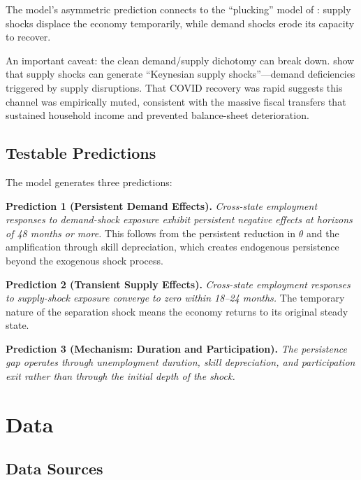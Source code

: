 \documentclass[12pt]{article}
\begin{document}
The model's asymmetric prediction connects to the ``plucking'' model of \citet{dupraz2022plucking}: supply shocks displace the economy temporarily, while demand shocks erode its capacity to recover.

An important caveat: the clean demand/supply dichotomy can break down. \citet{guerrieri2022macroeconomic} show that supply shocks can generate ``Keynesian supply shocks''---demand deficiencies triggered by supply disruptions. That COVID recovery was rapid suggests this channel was empirically muted, consistent with the massive fiscal transfers that sustained household income and prevented balance-sheet deterioration.

\subsection{Testable Predictions}

The model generates three predictions:

\medskip

\noindent \textbf{Prediction 1 (Persistent Demand Effects).} \textit{Cross-state employment responses to demand-shock exposure exhibit persistent negative effects at horizons of 48 months or more.} This follows from the persistent reduction in $\theta$ and the amplification through skill depreciation, which creates endogenous persistence beyond the exogenous shock process.

\medskip

\noindent \textbf{Prediction 2 (Transient Supply Effects).} \textit{Cross-state employment responses to supply-shock exposure converge to zero within 18--24 months.} The temporary nature of the separation shock means the economy returns to its original steady state.

\medskip

\noindent \textbf{Prediction 3 (Mechanism: Duration and Participation).} \textit{The persistence gap operates through unemployment duration, skill depreciation, and participation exit rather than through the initial depth of the shock.}


\section{Data}
\label{sec:data}

\subsection{Data Sources}
\end{document}
